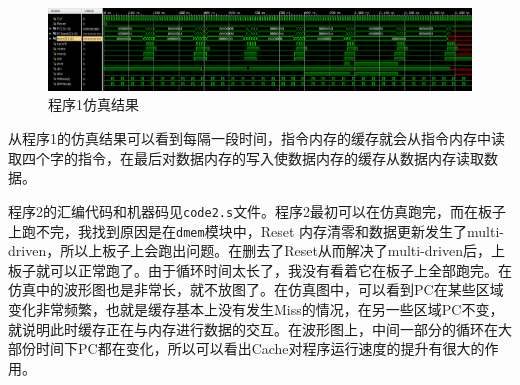 \documentclass[12pt,a4paper]{article}
\newcommand{\incode}[1]{\texttt{#1}} %
\begin{document}
\begin{figure}[htb]
	\centering
	\includegraphics[width=\textwidth]{csim1}
	\caption{程序1仿真结果}
	\label{fig:sim-1}
\end{figure}

从程序1的仿真结果可以看到每隔一段时间，指令内存的缓存就会从指令内存中读取四个字的指令，在最后对数据内存的写入使数据内存的缓存从数据内存读取数据。

程序2的汇编代码和机器码见\incode{code2.s}文件。程序2最初可以在仿真跑完，而在板子上跑不完，我找到原因是在\incode{dmem}模块中，Reset 内存清零和数据更新发生了multi-driven，所以上板子上会跑出问题。在删去了Reset从而解决了multi-driven后，上板子就可以正常跑了。由于循环时间太长了，我没有看着它在板子上全部跑完。在仿真中的波形图也是非常长，就不放图了。在仿真图中，可以看到PC在某些区域变化非常频繁，也就是缓存基本上没有发生Miss的情况，在另一些区域PC不变，就说明此时缓存正在与内存进行数据的交互。在波形图上，中间一部分的循环在大部份时间下PC都在变化，所以可以看出Cache对程序运行速度的提升有很大的作用。
\end{document}
